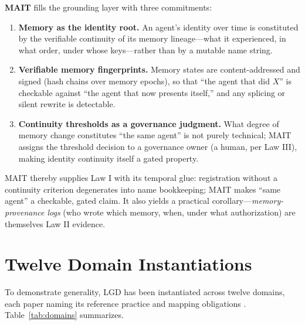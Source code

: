 \documentclass[12pt]{article}
\begin{document}
\textbf{MAIT} fills the grounding layer with three commitments:

\begin{enumerate}[itemsep=2pt]
  \item \textbf{Memory as the identity root.} An agent's identity over time is constituted by the verifiable continuity of its memory lineage---what it experienced, in what order, under whose keys---rather than by a mutable name string.
  \item \textbf{Verifiable memory fingerprints.} Memory states are content-addressed and signed (hash chains over memory epochs), so that ``the agent that did $X$'' is checkable against ``the agent that now presents itself,'' and any splicing or silent rewrite is detectable.
  \item \textbf{Continuity thresholds as a governance judgment.} What degree of memory change constitutes ``the same agent'' is not purely technical; MAIT assigns the threshold decision to a governance owner (a human, per Law III), making identity continuity itself a gated property.
\end{enumerate}

MAIT thereby supplies Law I with its temporal glue: registration without a continuity criterion degenerates into name bookkeeping; MAIT makes ``same agent'' a checkable, gated claim. It also yields a practical corollary---\emph{memory-provenance logs} (who wrote which memory, when, under what authorization) are themselves Law II evidence.

\section{Twelve Domain Instantiations}\label{sec:domains}

To demonstrate generality, LGD has been instantiated across twelve domains, each paper naming its reference practice and mapping obligations \cite{lgdrepo}. Table~\ref{tab:domains} summarizes.
\end{document}
